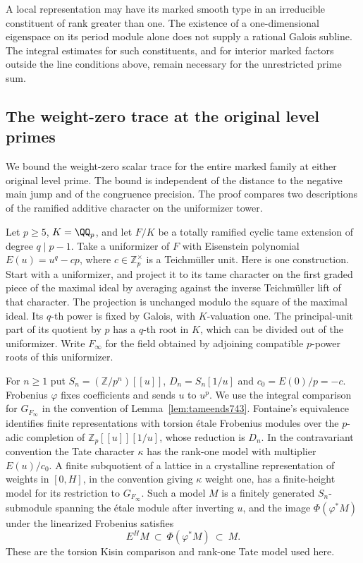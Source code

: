 \documentclass[a4paper,11pt]{article}
\theoremstyle{definition}
\theoremstyle{remark}
\numberwithin{equation}{section}
\begin{document}
A local representation may have its marked smooth type in an
irreducible constituent of rank greater than one. The existence
of a one-dimensional eigenspace on its period module alone
does not supply a rational Galois subline. The integral estimates
for such constituents, and for interior marked factors outside
the line conditions above, remain necessary for the unrestricted
prime sum.
\clearpage

\subsection{The weight-zero trace at the original level primes}
\label{sec:logold748}
We bound the weight-zero scalar trace for the entire marked
family at either original level prime. The bound is independent
of the distance to the negative main jump and of the congruence
precision. The proof compares two descriptions of the ramified
additive character on the uniformizer tower.

Let \(p\ge5\), \(K=\QQ_p\), and let \(F/K\) be a totally ramified
cyclic tame extension of degree \(q\mid p-1\). Take a uniformizer
of \(F\) with Eisenstein polynomial \(E(u)=u^q-cp\), where
\(c\in\mathbb Z_p^\times\) is a Teichm\"uller unit. Here is one
construction. Start with a uniformizer, and project it to its
tame character on the first graded piece of the maximal ideal
by averaging against the inverse Teichm\"uller lift of that
character. The projection is unchanged modulo the square of
the maximal ideal. Its \(q\)-th power is fixed by Galois, with
\(K\)-valuation one. The principal-unit part of its quotient by
\(p\) has a \(q\)-th root in \(K\), which can be divided out of
the uniformizer. Write \(F_\infty\) for the field obtained by
adjoining compatible \(p\)-power roots of this uniformizer.

For \(n\ge1\) put \(S_n=(\mathbb Z/p^n)[[u]]\),
\(D_n=S_n[1/u]\) and \(c_0=E(0)/p=-c\).
Frobenius \(\varphi\) fixes coefficients and sends \(u\) to
\(u^p\). We use the integral comparison for \(G_{F_\infty}\)
in the convention of Lemma~\ref{lem:tameends743}. Fontaine's
equivalence identifies finite representations with torsion
\'etale Frobenius modules over the \(p\)-adic completion of
\(\mathbb Z_p[[u]][1/u]\), whose reduction is \(D_n\). In the
contravariant convention the Tate character \(\kappa\) has the
rank-one model with multiplier \(E(u)/c_0\).
A finite subquotient of a lattice in a crystalline representation
of weights in \([0,H]\), in the convention giving \(\kappa\)
weight one, has a finite-height model for its restriction to
\(G_{F_\infty}\). Such a model \(M\) is a finitely generated
\(S_n\)-submodule spanning the \'etale module after inverting
\(u\), and the image \(\Phi(\varphi^*M)\) under the linearized
Frobenius satisfies
\[
                 E^H M\ \subset\ \Phi(\varphi^*M)\ \subset\ M.
\]
These are the torsion Kisin comparison and rank-one Tate model
used here.~\cite[\S\S2--3, especially Example~2.3.5]{III-II-liutorsion748}
\end{document}
